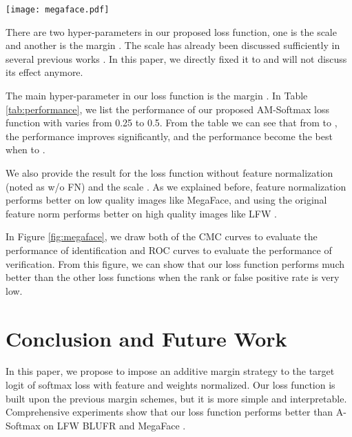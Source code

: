 \documentclass[10pt,twocolumn,letterpaper]{article}
\begin{document}
\begin{figure*}
	\centering
	\texttt{[image: megaface.pdf]}
	\caption{ \emph{Left:} CMC curves of different loss functions with 1M distractors on MegaFace\cite{kemelmacher2016megaface} Set 1. \emph{Right:} ROC curves of different loss functions with 1M distractors on MegaFace\cite{kemelmacher2016megaface} Set 1. Note that for Center Loss and NormFace, the backend network is ResNet-28\cite{wen2016discriminative}, while others are based on ResNet-20\cite{liu2017sphereface}. Even though the curves of the Center Loss model and the NormFace model is close to the SphereFace model, please keep in mind that part of the performance comes from the bigger network structure. }
	\label{fig:megaface}
\end{figure*}

There are two hyper-parameters in our proposed loss function, one is the scale  and another is the margin . The scale  has already been discussed sufficiently in several previous works \cite{wang2017normface, liu_2017_coco_v2, ranjan2017l2}. In this paper, we directly fixed it to  and will not discuss its effect anymore.

The main hyper-parameter in our loss function is the margin . In Table \ref{tab:performance}, we list the performance of our proposed AM-Softmax loss function with  varies from 0.25 to 0.5. From the table we can see that from  to , the performance improves significantly, and the performance become the best when  to . 

We also provide the result for the loss function without feature normalization (noted as w/o FN) and the scale . As we explained before, feature normalization performs better on low quality images like MegaFace\cite{kemelmacher2016megaface}, and using the original feature norm performs better on high quality images like LFW \cite{huang2007labeled}.

In Figure \ref{fig:megaface}, we draw both of the CMC curves to evaluate the performance of identification and ROC curves to evaluate the performance of verification. From this figure, we can show that our loss function performs much better than the other loss functions when the rank or false positive rate is very low. 

\section{Conclusion and Future Work}
In this paper, we propose to impose an additive margin strategy to the target logit of softmax loss with feature and weights normalized. Our loss function is built upon the previous margin schemes\cite{liu2017sphereface,liu2016large}, but it is more simple and interpretable. Comprehensive experiments show that our loss function performs better than A-Softmax \cite{liu2017sphereface} on LFW BLUFR \cite{liao2014benchmark} and MegaFace \cite{kemelmacher2016megaface}. 
\end{document}
